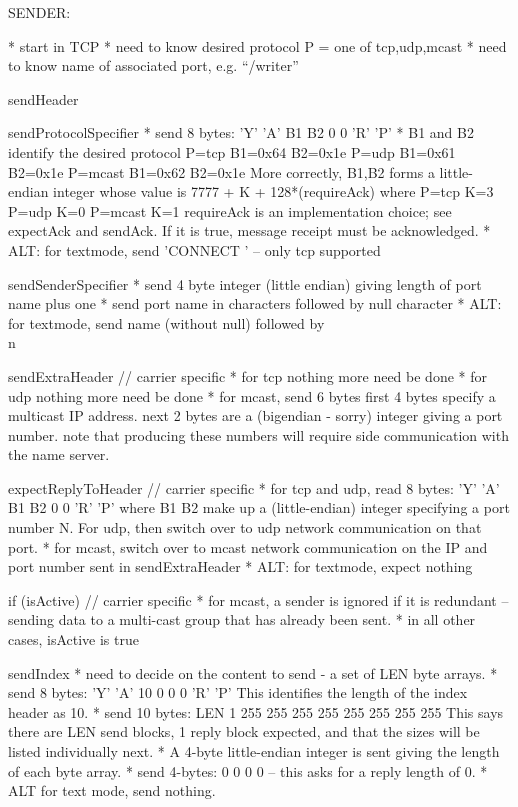 \documentclass[a4]{article}
\begin{document}
\begin{code}

SENDER:

  * start in TCP
  * need to know desired protocol P = one of tcp,udp,mcast
  * need to know name of associated port, e.g. ``/writer''

  sendHeader

    sendProtocolSpecifier
    * send 8 bytes: 'Y' 'A' B1 B2 0 0 'R' 'P'
    * B1 and B2 identify the desired protocol
         P=tcp   B1=0x64 B2=0x1e
         P=udp   B1=0x61 B2=0x1e
         P=mcast B1=0x62 B2=0x1e
      More correctly, {B1,B2} forms a little-endian integer whose value is
         7777 + K + 128*(requireAck)
      where 
         P=tcp   K=3
	 P=udp   K=0
	 P=mcast K=1
      requireAck is an implementation choice; see expectAck and sendAck.
      If it is true, message receipt must be acknowledged.
    * ALT: for textmode, send 'CONNECT ' -- only tcp supported

    sendSenderSpecifier
    * send 4 byte integer (little endian) giving length of port name plus one
    * send port name in characters followed by null character
    * ALT: for textmode, send name (without null) followed by \\n

    sendExtraHeader      // carrier specific
    * for tcp nothing more need be done
    * for udp nothing more need be done
    * for mcast, send 6 bytes
         first 4 bytes specify a multicast IP address.
	 next 2 bytes are a (bigendian - sorry) integer giving a port number.
         note that producing these numbers will require side communication
         with the name server.

  expectReplyToHeader    // carrier specific
    * for tcp and udp, read 8 bytes:  'Y' 'A' B1 B2 0 0 'R' 'P' where
      B1 B2 make up a (little-endian) integer specifying a port number N.
      For udp, then switch over to udp network communication on that port.
    * for mcast, switch over to mcast network communication on the IP and
      port number sent in sendExtraHeader
    * ALT: for textmode, expect nothing

  if (isActive)          // carrier specific
  * for mcast, a sender is ignored if it is redundant -- sending
    data to a multi-cast group that has already been sent.
  * in all other cases, isActive is true

    sendIndex
    * need to decide on the content to send - a set of LEN byte arrays.
    * send 8 bytes: 'Y' 'A' 10 0 0 0 'R' 'P'
      This identifies the length of the index header as 10.
    * send 10 bytes: LEN 1   255 255 255 255  255 255 255 255
      This says there are LEN send blocks, 1 reply block expected,
      and that the sizes will be listed individually next.
    * A 4-byte little-endian integer is sent giving the length of
      each byte array.
    * send 4-bytes: 0 0 0 0 -- this asks for a reply length of 0.
    * ALT for text mode, send nothing.


\end{code}
\end{document}
